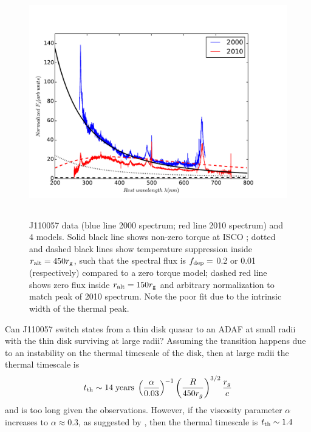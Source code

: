 \documentclass[11pt,a4paper]{article}
\begin{document}
\begin{figure}
  \centering
  \includegraphics[width=12.00cm, height=10.0cm, trim=0.3cm 0.0cm 2.0cm 0.0cm, clip]
  {../plots/models/mcd_gap_v3_2_b1.pdf}
  \caption[]{
J110057 data (blue line 2000 spectrum; red line 2010 spectrum) and 4
models. Solid black line shows non-zero torque at ISCO
\citep[following] []{Afshordi_Paczynski2003}; dotted and dashed black
lines show temperature suppression inside $r_{\rm alt} = 450 r_{\rm
g}$, such that the spectral flux is $f_{\rm dep} = $ 0.2 or 0.01
(respectively) compared to a zero torque model; dashed red line shows
zero flux inside $r_{\rm alt} = 150 r_{\rm g}$ and arbitrary
normalization to match peak of 2010 spectrum. Note the poor fit due to
the intrinsic width of the thermal peak.
  }
  \label{fig:disk_suppression}
\end{figure}
Can J110057 switch states from a thin disk quasar to an ADAF at small
radii with the thin disk surviving at large radii?  Assuming the
transition happens due to an instability on the thermal timescale of
the disk, then at large radii the thermal timescale is
\begin{equation}
    t_{\rm th} \sim 14 \; {\rm years} \; \left(\frac{\alpha}{0.03}\right)^{-1}
                                                \left(\frac{R}{450r_{g}}\right)^{3/2} 
                                                        \frac{r_{g}}{c}
\end{equation} 
and is too long given the observations. However, if the viscosity
parameter $\alpha$ increases to $\alpha \approx 0.3$, as suggested by
\citet{King2007}, then the thermal timescale is $t_{\rm th} \sim 1.4$
\end{document}
